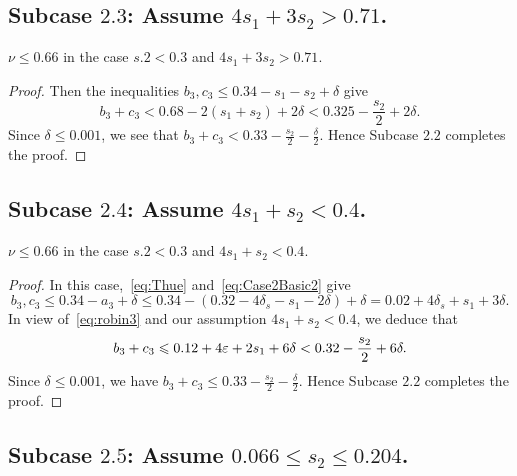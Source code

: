 \subsection*{Subcase $\mathbf{2.3}$: Assume $4s_1+3s_2>0.71$.}

\begin{lemma}\label{lem:Subcase2.3}
  \leanok
  $\nu \leq 0.66$ in the case $s.2 < 0.3$ and $4s_1+3s_2>0.71$.
\end{lemma}
\begin{proof}
  Then the inequalities $b_3,c_3 \le 0.34-s_1-s_2+ \delta$ give
  \[
  b_3+c_3<0.68-2(s_1+s_2)+2\delta<
  0.325 -\frac{s_2}{2}+2\delta.
  \]
  Since $\delta\leq 0.001$, we see that $b_3+c_3<0.33-\frac{s_2}{2}-\frac{\delta}{2}$.
  Hence Subcase $\mathbf{2.2}$ completes the proof.
\end{proof}

\subsection*{Subcase $\mathbf{2.4}$: Assume $4s_1+s_2<0.4$.}

\begin{lemma}\label{lem:Subcase2.4}
  \leanok
  $\nu \leq 0.66$ in the case $s.2 < 0.3$ and $4s_1+s_2<0.4$.
\end{lemma}
\begin{proof}
  In this case,~\eqref{eq:Thue} and~\eqref{eq:Case2Basic2} give
  \[
  b_3,c_3 \le 0.34-a_3+\delta \le 0.34 - (0.32-4\delta_s-s_1-2\delta) +\delta= 0.02+4\delta_s+s_1+3\delta.
  \]
  In view of~\eqref{eq:robin3} and
  our assumption $4s_1+s_2<0.4$, we deduce that
  \begin{align*}
  b_3+c_3 \leqslant 0.12+4\varepsilon + 2s_1+6\delta <
  0.32-\frac{s_2}{2}+6\delta.
  \end{align*}
  Since $\delta\leq 0.001$, we have $b_3+c_3 \le 0.33-\frac{s_2}{2}-\frac{\delta}{2}$. Hence
  Subcase $\mathbf{2.2}$ completes the proof.
\end{proof}


\subsection*{Subcase $\mathbf{2.5}$: Assume $0.066\leq s_2\leq
0.204$.}

